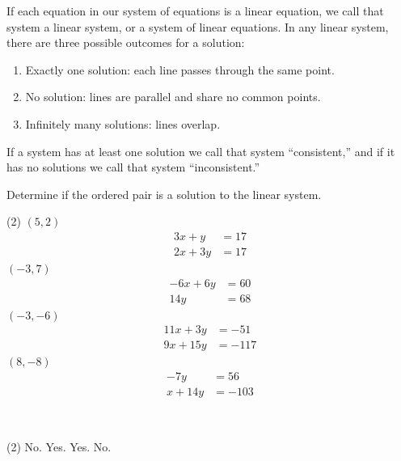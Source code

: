 \documentclass[12pt,fleqn]{book}
\newcommand{\prb}[1]{\begin{Exercise}#1\end{Exercise}}
\newcommand{\sol}[1]{\begin{Answer}#1\end{Answer}}
\begin{document}
If each equation in our system of equations is a linear equation, we call that system a linear system, or a system of linear equations.  In any linear system, there are three possible outcomes for a solution:
\begin{enumerate}
	\item Exactly one solution: each line passes through the same point.
	\item No solution: lines are parallel and share no common points.
	\item Infinitely many solutions: lines overlap.
\end{enumerate}
If a system has at least one solution we call that system ``consistent,'' and if it has no solutions we call that system ``inconsistent.''
\prb{Determine if the ordered pair is a solution to the linear system.
	\begin{tasks}(2)
		\task $(5,2)$
		\begin{align*}
			3x+y  & =17 \\
			2x+3y & =17
		\end{align*}
		\vspace{1in}
		\task $(-3,7)$
		\begin{align*}
			-6x+6y & =60 \\
			14y    & =68
		\end{align*}
		\vspace{1in}
		\task $(-3,-6)$
		\begin{align*}
			11x+3y & =-51  \\
			9x+15y & =-117
		\end{align*}
		\vspace{1in}
		\task $(8,-8)$
		\begin{align*}
			-7y   & =56   \\
			x+14y & =-103
		\end{align*}
	\end{tasks}
	\vspace{1in}
}
\sol{\
	\begin{tasks}(2)
		\task No.
		\task Yes.
		\task Yes.
		\task No.
	\end{tasks}
}
\end{document}
